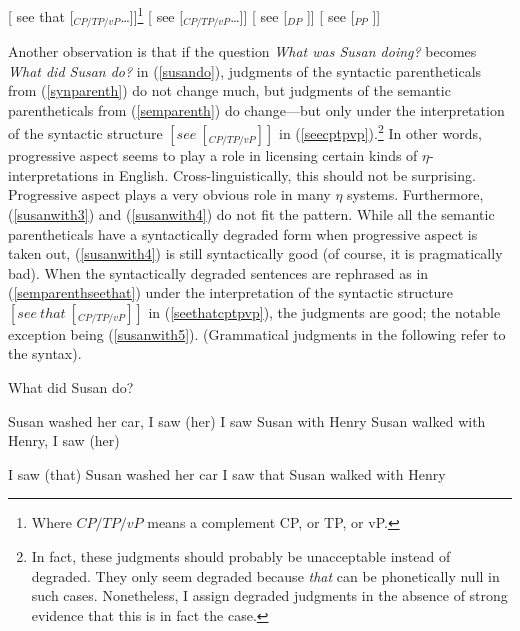 \documentclass{article}
\begin{document}
\begin{exe}
\ex {}[ see that [$_{CP/TP/vP}$\ldots ]]\label{seethatcptpvp}\footnote{Where $CP/TP/vP$ means a complement CP, or TP, or vP.} 
\ex {}[ see [$_{CP/TP/vP}$\ldots ]]\label{seecptpvp} 
\ex {}[ see [$_{DP}$ ]]\label{seedp}
\ex {}[ see [$_{PP}$ ]]\label{seepp}
\end{exe}      

Another observation is that if the question {\sl What was Susan doing?} becomes {\sl What did Susan do?} in (\ref{susando}), judgments of the syntactic parentheticals from (\ref{synparenth}) do not change much, but judgments of the semantic parentheticals from (\ref{semparenth}) do change---but only under the interpretation of the syntactic structure $[ see \ [_{CP/TP/vP} ]]$ in (\ref{seecptpvp}).\footnote{In fact, these judgments should probably be unacceptable instead of degraded. They only seem degraded because {\sl that} can be phonetically null in such cases. Nonetheless, I assign degraded judgments in the absence of strong evidence that this is in fact the case.} In other words, progressive aspect seems to play a role in licensing certain kinds of $\eta$-interpretations in English. Cross-linguistically, this should not be surprising. Progressive aspect plays a very obvious role in many $\eta$ systems. Furthermore, (\ref{susanwith3}) and (\ref{susanwith4}) do not fit the pattern. While all the semantic parentheticals have a syntactically degraded form when progressive aspect is taken out, (\ref{susanwith4}) is still syntactically good (of course, it is pragmatically bad). When the syntactically degraded sentences are rephrased as in (\ref{semparenthseethat}) under the interpretation of the syntactic structure $[ see \ that \ [_{CP/TP/vP} ]]$ in (\ref{seethatcptpvp}), the judgments are good; the notable exception being (\ref{susanwith5}). (Grammatical judgments in the following refer to the syntax). 

 \begin{exe}
\ex What did Susan do?\label{susando}
\begin{xlist}
\ex Susan washed her car, I saw (her)\label{susanwashed}
\label{susanwith3}
\ex I saw Susan with Henry\label{susanwith4}
\ex Susan walked with Henry, I saw (her)\label{susanwalked}
\end{xlist}
\end{exe} 

\begin{exe}
\ex \label{semparenthseethat}
\begin{xlist}
\ex I saw (that) Susan washed her car
\label{susanwith5}
\ex I saw that Susan walked with Henry
\end{xlist}
\end{exe} 
\end{document}
